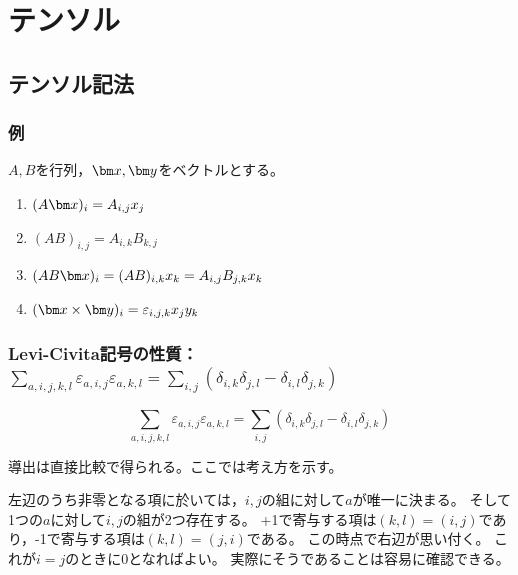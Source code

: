 \chapter{テンソル}
    \section{テンソル記法}
        \subsection{例}
            $A,B$を行列，$\vx,\vy$をベクトルとする。
            \begin{enumerate}
                \item $(A\vx)_i = A_{i,j}x_j$
                \item $(AB)_{i,j} = A_{i,k}B_{k,j}$
                \item $(AB\vx)_i = (AB)_{i,k}x_k = A_{i,j}B_{j,k}x_k$
                \item $(\vx\times\vy)_i = \varepsilon_{i,j,k}x_j y_k$
            \end{enumerate}
        \subsection{Levi-Civita記号の性質：\texorpdfstring{$\sum_{a,i,j,k,l}\varepsilon_{a,i,j}\varepsilon_{a,k,l} = \sum_{i,j}(\delta_{i,k}\delta_{j,l} - \delta_{i,l}\delta_{j,k})$}{2 個のεの積と，δの積和}}
            \begin{shadebox}
                \begin{equation}
                    \sum_{a,i,j,k,l}\varepsilon_{a,i,j}\varepsilon_{a,k,l} = \sum_{i,j}(\delta_{i,k}\delta_{j,l} - \delta_{i,l}\delta_{j,k})
                \end{equation}
            \end{shadebox}
            導出は直接比較で得られる。ここでは考え方を示す。
            \par
            左辺のうち非零となる項に於いては，$i,j$の組に対して$a$が唯一に決まる。
            そして1つの$a$に対して$i,j$の組が2つ存在する。
            +1で寄与する項は$(k,l)=(i,j)$であり，-1で寄与する項は$(k,l)=(j,i)$である。
            この時点で右辺が思い付く。
            これが$i=j$のときに0となればよい。
            実際にそうであることは容易に確認できる。